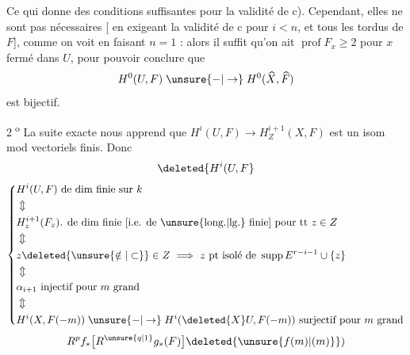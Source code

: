Ce qui donne des conditions suffisantes pour la validité de c). Cependant, elles ne sont pas nécessaires [ en exigeant la validité de c pour $i<n$, et tous les tordus de $F$], comme on voit en faisant $n=1$ : alors il suffit qu'on ait $\operatorname{prof} F_x\geq2$ pour $x$ fermé dans $U$, pour pouvoir conclure que
\[
H^0(U,F)\mathrel{\unsure{-|\to}}H^0(\widehat X,\widehat F)
\]
est bijectif.

\textcircled{\scriptsize 2\textsuperscript{o}} La suite exacte nous apprend que  $H^i(U,F)\to H^{i+1}_Z(X,F)$ est un isom mod vectoriels finis. Donc
\[
\deleted{H^i(U,F}
\]
\[
\left\{\begin{aligned}
&H^i(U,F)\text{ de dim finie sur }k\\
&\Updownarrow\\
&H^{i+1}_z(F_z)\text{. de dim finie [i.e. de \unsure{long.|lg.} finie] pour tt }z\in Z\\
&\Updownarrow\\
&z\deleted{\unsure{\notin|\subset}}\in Z\ \Longrightarrow\ z\text{ pt isolé de }\operatorname{supp} E^{r-i-1}\cup\{z\}\\
&\Updownarrow\\
&\alpha_{i+1}\text{ injectif pour }m\text{ grand}\\
&\Updownarrow\\
&H^i(X,F(-m))\mathrel{\unsure{-|\to}}H^i(\deleted{X}U,F(-m))\ \text{surjectif pour }m\text{ grand}
\end{aligned}\right.
\]
\[
R^p f_*\bigl[R^{\unsure{q|1}} g_*(F)\bigr]\deleted{\unsure{f(m)|({m})}})
\]
